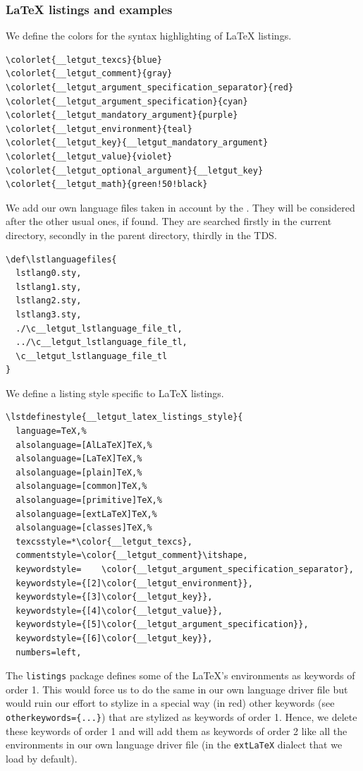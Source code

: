 \documentclass{letgut}
\begin{document}
\subsubsection{\LaTeX{} listings and examples}
\label{sec:orga99a9b5}

We define the colors for the syntax highlighting of \LaTeX{} listings.

\begin{lstlisting}
\colorlet{__letgut_texcs}{blue}
\colorlet{__letgut_comment}{gray}
\colorlet{__letgut_argument_specification_separator}{red}
\colorlet{__letgut_argument_specification}{cyan}
\colorlet{__letgut_mandatory_argument}{purple}
\colorlet{__letgut_environment}{teal}
\colorlet{__letgut_key}{__letgut_mandatory_argument}
\colorlet{__letgut_value}{violet}
\colorlet{__letgut_optional_argument}{__letgut_key}
\colorlet{__letgut_math}{green!50!black}
\end{lstlisting}

We add our own language files taken in account by the . They
will be considered after the other usual ones, if found. They are searched firstly
in the current directory, secondly in the parent directory, thirdly in the TDS.

\begin{lstlisting}
\def\lstlanguagefiles{
  lstlang0.sty,
  lstlang1.sty,
  lstlang2.sty,
  lstlang3.sty,
  ./\c__letgut_lstlanguage_file_tl,
  ../\c__letgut_lstlanguage_file_tl,
  \c__letgut_lstlanguage_file_tl
}
\end{lstlisting}

We define a listing style specific to \LaTeX{} listings.

\begin{lstlisting}
\lstdefinestyle{__letgut_latex_listings_style}{
  language=TeX,%
  alsolanguage=[AlLaTeX]TeX,%
  alsolanguage=[LaTeX]TeX,%
  alsolanguage=[plain]TeX,%
  alsolanguage=[common]TeX,%
  alsolanguage=[primitive]TeX,%
  alsolanguage=[extLaTeX]TeX,%
  alsolanguage=[classes]TeX,%
  texcsstyle=*\color{__letgut_texcs},
  commentstyle=\color{__letgut_comment}\itshape,
  keywordstyle=    \color{__letgut_argument_specification_separator},
  keywordstyle={[2]\color{__letgut_environment}},
  keywordstyle={[3]\color{__letgut_key}},
  keywordstyle={[4]\color{__letgut_value}},
  keywordstyle={[5]\color{__letgut_argument_specification}},
  keywordstyle={[6]\color{__letgut_key}},
  numbers=left,
\end{lstlisting}

The \lstinline+listings+ package defines some of the LaTeX's environments as keywords of
order 1. This would force us to do the same in our own language driver file but
would ruin our effort to stylize in a special way (in red) other keywords (see
\lstinline+otherkeywords={...}+) that are stylized as keywords of order 1. Hence, we
delete these keywords of order 1 and will add them as keywords of order 2 like
all the environments in our own language driver file (in the \lstinline+extLaTeX+ dialect
that we load by default).
\end{document}
